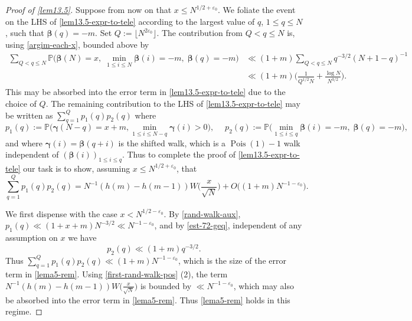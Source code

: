 \documentclass[11pt,reqno]{amsart}
\numberwithin{equation}{section}
\theoremstyle{definition}
\theoremstyle{remark}
\newcommand{\mb}{\mathbb}
\newcommand{\eps}{\varepsilon}
\newcommand\Pois{\operatorname{Pois}}
\def\boldbeta{\boldsymbol\beta}
\def\boldgamma{\boldsymbol\gamma}
\renewcommand{\le}{\leqslant}
\begin{document}
\begin{proof}[Proof of \cref{lem13.5}]
Suppose from now on that $x \le N^{1/2 + \eps_0}$. We foliate the event on the LHS of \cref{lem13.5-expr-to-tele} according to the largest value of $q$, $1 \le q  \le N$, such that $\boldbeta(q) = -m$. Set $Q := \lfloor N^{2\eps_0}\rfloor$. The contribution from $Q < q \le N$ is, using \cref{argim-each-x}, bounded above by
\begin{align*}  \sum_{Q < q \le N}\mb{P} \big(\boldbeta(N) = x,\; \min_{1 \le i \le N} \boldbeta(i) = -m, \; \boldbeta(q) = -m\big) & \ll (1 + m) \sum_{Q < q \le N} q^{-3/2} (N + 1 - q)^{-1}  \\ & \ll  (1 + m)  \big(\frac{1}{Q^{1/2} N}  + \frac{\log N}{N^{3/2}}\big) . \end{align*} This may be absorbed into the error term in \cref{lem13.5-expr-to-tele} due to the choice of $Q$. 
The remaining contribution to the LHS of \cref{lem13.5-expr-to-tele} may be written as $\sum_{q = 1}^Q p_1(q) p_2(q)$ where
\[ p_1(q) :=  \mb{P}\big( \boldgamma(N - q) = x + m, \min_{1 \le i \le N - q} \boldgamma(i) > 0\big), \;\quad p_2(q) :=  \mb{P} \big(  \min_{1 \le i \le q} \boldbeta(i) = -m, \; \boldbeta(q) = -m\big),\] and where $\boldgamma(i) = \boldbeta(q + i)$ is the shifted walk, which is a $\Pois(1) - 1$ walk independent of $(\boldbeta(i))_{1 \le i \le q}$. Thus to complete the proof of \cref{lem13.5-expr-to-tele} our task is to show, assuming $x \le N^{1/2 + \eps_0}$, that 
\begin{equation}\label{lema5-rem} \sum_{q = 1}^Q p_1(q) p_2(q) = N^{-1} (h(m) - h(m-1)) W\big(\frac{x}{\sqrt{N}}\big) + O \big( (1 + m) N^{-1 - \eps_0}\big).\end{equation}

We first dispense with the case $x < N^{1/2 - \eps_0}$. By \cref{rand-walk-aux}, $p_1(q) \ll (1 + x + m) N^{-3/2} \ll N^{-1 - \eps_0}$, and by \cref{est-72-geq}, independent of any assumption on $x$ we have\begin{equation}\label{p2q-bd} p_2(q) \ll (1 + m) q^{-3/2}.\end{equation} Thus $\sum_{q = 1}^Q p_1(q) p_2(q) \ll (1 + m) N^{-1-\eps_0}$, which is the size of the error term in \cref{lema5-rem}. Using \cref{first-rand-walk-pos} (2), the term $N^{-1} (h(m) - h(m - 1)) W\big(\frac{x}{\sqrt{N}})$ is bounded by $\ll N^{-1 - \eps_0}$, which may also be absorbed into the error term in \cref{lema5-rem}. Thus \cref{lema5-rem} holds in this regime.


\end{proof}
\end{document}
